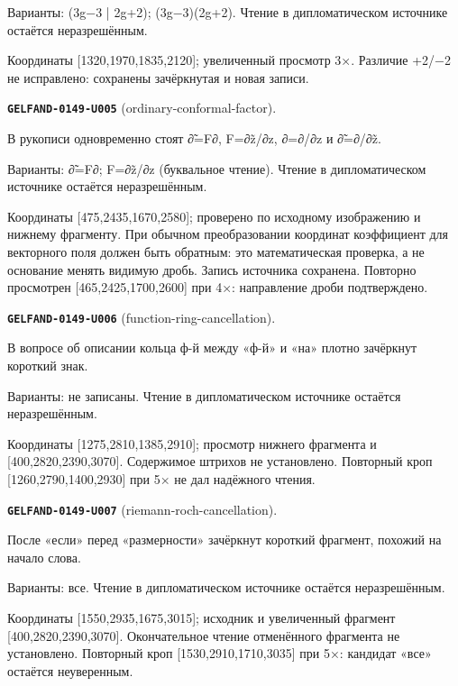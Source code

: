 \documentclass[11pt]{article}
\theoremstyle{definition}
\theoremstyle{remark}
\begin{document}
Варианты: (3g−3 | 2g+2); (3g−3)(2g+2). Чтение в дипломатическом источнике остаётся неразрешённым.\par
Координаты [1320,1970,1835,2120]; увеличенный просмотр 3×. Различие +2/−2 не исправлено: сохранены зачёркнутая и новая записи.\par\medskip
\noindent\leavevmode{}\label{GELFAND-P001369:ordinary-conformal-factor:note}\textbf{\texttt{GELFAND-0149-U005}} (ordinary-conformal-factor).\par\nopagebreak[4]
В рукописи одновременно стоят ∂̃=F∂, F=∂z̃/∂z, ∂=∂/∂z и ∂̃=∂/∂z̃.\par
Варианты: ∂̃=F∂; F=∂z̃/∂z (буквальное чтение). Чтение в дипломатическом источнике остаётся неразрешённым.\par
Координаты [475,2435,1670,2580]; проверено по исходному изображению и нижнему фрагменту. При обычном преобразовании координат коэффициент для векторного поля должен быть обратным: это математическая проверка, а не основание менять видимую дробь. Запись источника сохранена. Повторно просмотрен [465,2425,1700,2600] при 4×: направление дроби подтверждено.\par\medskip
\noindent\leavevmode{}\label{GELFAND-P001369:function-ring-cancellation:note}\textbf{\texttt{GELFAND-0149-U006}} (function-ring-cancellation).\par\nopagebreak[4]
В вопросе об описании кольца ф-й между «ф-й» и «на» плотно зачёркнут короткий знак.\par
Варианты: не записаны. Чтение в дипломатическом источнике остаётся неразрешённым.\par
Координаты [1275,2810,1385,2910]; просмотр нижнего фрагмента и [400,2820,2390,3070]. Содержимое штрихов не установлено. Повторный кроп [1260,2790,1400,2930] при 5× не дал надёжного чтения.\par\medskip
\noindent\leavevmode{}\label{GELFAND-P001369:riemann-roch-cancellation:note}\textbf{\texttt{GELFAND-0149-U007}} (riemann-roch-cancellation).\par\nopagebreak[4]
После «если» перед «размерности» зачёркнут короткий фрагмент, похожий на начало слова.\par
Варианты: все. Чтение в дипломатическом источнике остаётся неразрешённым.\par
Координаты [1550,2935,1675,3015]; исходник и увеличенный фрагмент [400,2820,2390,3070]. Окончательное чтение отменённого фрагмента не установлено. Повторный кроп [1530,2910,1710,3035] при 5×: кандидат «все» остаётся неуверенным.\par\medskip
\end{document}
